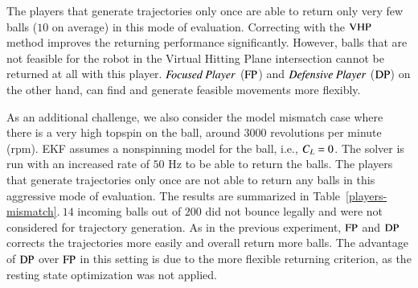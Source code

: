 The players that generate trajectories only once are able to return only very few balls ($10$ on average) in this mode of evaluation. Correcting with the $\mathrm{VHP}$ method improves the returning performance significantly. However, balls that are not feasible for the robot in the Virtual Hitting Plane intersection cannot be returned at all with this player. $\emph{Focused Player}$ ($\mathrm{FP}$) and $\emph{Defensive Player}$ ($\mathrm{DP}$) on the other hand, can find and generate feasible movements more flexibly.

As an additional challenge, we also consider the model mismatch case where there is a very high topspin on the ball, around $3000$ revolutions per minute (rpm). EKF assumes a nonspinning model for the ball, i.e., $C_{L} = 0$. The solver is run with an increased rate of $50$ Hz to be able to return the balls. The players that generate trajectories only once are not able to return any balls in this aggressive mode of evaluation. The results are summarized in Table~\ref{players-mismatch}.$\ 14$ incoming balls out of $200$ did not bounce legally and were not considered for trajectory generation. As in the previous experiment, $\mathrm{FP}$ and $\mathrm{DP}$ corrects the trajectories more easily and overall return more balls. The advantage of $\mathrm{DP}$ over $\mathrm{FP}$ in this setting is due to the more flexible returning criterion, as the resting state optimization was not applied.